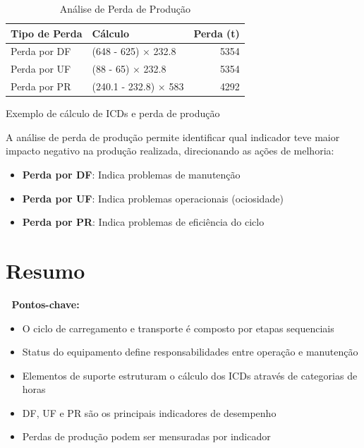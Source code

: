 \documentclass[
  letterpaper,
]{book}
\providecommand{\tightlist}{%
  \setlength{\itemsep}{0pt}\setlength{\parskip}{0pt}}\usepackage{longtable,booktabs,array}
\begin{document}
\begin{longtable}[t]{llr}
\caption{Análise de Perda de Produção}\\
\toprule
Tipo de Perda & Cálculo & Perda (t)\\
\midrule
Perda por DF & (648 - 625) × 232.8 & 5354\\
Perda por UF & (88 - 65) × 232.8 & 5354\\
Perda por PR & (240.1 - 232.8) × 583 & 4292\\
\bottomrule
\end{longtable}

Exemplo de cálculo de ICDs e perda de produção

\begin{tcolorbox}[enhanced jigsaw, titlerule=0mm, coltitle=black, rightrule=.15mm, colback=white, breakable, title=\textcolor{quarto-callout-important-color}{\faExclamation}\hspace{0.5em}{Interpretação das Perdas}, opacityback=0, bottomtitle=1mm, opacitybacktitle=0.6, arc=.35mm, colbacktitle=quarto-callout-important-color!10!white, toptitle=1mm, bottomrule=.15mm, left=2mm, toprule=.15mm, leftrule=.75mm, colframe=quarto-callout-important-color-frame]

A análise de perda de produção permite identificar qual indicador teve
maior impacto negativo na produção realizada, direcionando as ações de
melhoria:

\begin{itemize}
\tightlist
\item
  \textbf{Perda por DF}: Indica problemas de manutenção
\item
  \textbf{Perda por UF}: Indica problemas operacionais (ociosidade)
\item
  \textbf{Perda por PR}: Indica problemas de eficiência do ciclo
\end{itemize}

\end{tcolorbox}

\section{Resumo}\label{resumo}

🔔 \textbf{Pontos-chave:}

\begin{itemize}
\tightlist
\item
  O ciclo de carregamento e transporte é composto por etapas sequenciais
\item
  Status do equipamento define responsabilidades entre operação e
  manutenção
\item
  Elementos de suporte estruturam o cálculo dos ICDs através de
  categorias de horas
\item
  DF, UF e PR são os principais indicadores de desempenho
\item
  Perdas de produção podem ser mensuradas por indicador
\end{itemize}
\end{document}

